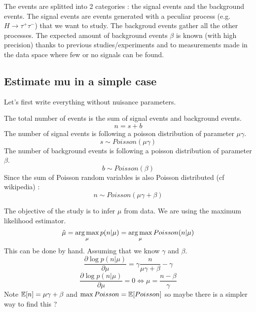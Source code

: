 The events are splitted into 2 categories : the signal events and the background events.
The signal events are events generated with a peculiar process (e.g. $H\to \tau^+ \tau^-$) that we want to study.
The backgroud events gather all the other processes.
The expected amount of background events $\beta$ is known (with high precision) thanks to previous studies/experiments and to measurements made in the data space where few or no signals can be found.



\subsection{Estimate mu in a simple case} %
\label{sub:estimate_mu_in_a_simple_case}

Let's first write everything without nuisance parameters.

The total number of events is the sum of signal events and background events.
\begin{equation}
	n = s + b
\end{equation}
The number of signal events is following a poisson distribution of parameter $\mu \gamma$.
\begin{equation}
	s \sim Poisson(\mu \gamma)
\end{equation}
The number of background events is following a poisson distribution of parameter $\beta$.
\begin{equation}
	b \sim Poisson(\beta)
\end{equation}
Since the sum of Poisson random variables is also Poisson distributed \needcite (cf wikipedia) :
\begin{equation}
	n \sim Poisson(\mu \gamma + \beta)
\end{equation}

The objective of the study is to infer $\mu$ from data.
We are using the maximum likelihood estimator.
\begin{equation}
    \hat \mu = \operatorname*{arg\,max}_\mu p(n|\mu) =  \operatorname*{arg\,max}_\mu Poisson(n|\mu)
\end{equation}
This can be done by hand. Assuming that we know $\gamma$ and  $\beta$.
\begin{equation}
    \frac{\partial \log p(n|\mu)}{\partial \mu} =  \gamma \frac{n}{\mu\gamma + \beta} - \gamma
\end{equation}
\begin{equation}
    \frac{\partial \log p(n|\mu)}{\partial \mu} = 0 \iff \mu = \frac{n-\beta}{\gamma}
\end{equation}
Note $\mathbb{E}[n] = \mu\gamma + \beta$ and $\max Poisson = \mathbb{E}[Poisson]$ so maybe there is a simpler way to find this ?




